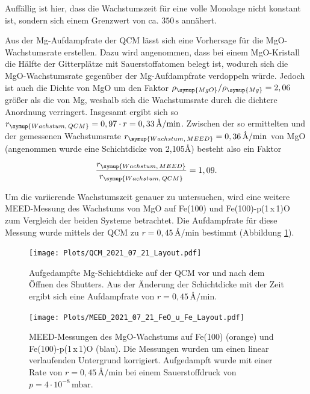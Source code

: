 Auffällig ist hier, dass die Wachstumszeit für eine volle Monolage nicht konstant ist, sondern sich einem Grenzwert von ca. $350\,\si{\second}$ annähert.

Aus der Mg-Aufdampfrate der QCM lässt sich eine Vorhersage für die MgO-Wachstumsrate erstellen. Dazu wird angenommen, dass 
bei einem MgO-Kristall die Hälfte der Gitterplätze mit Sauerstoffatomen belegt ist, wodurch sich die MgO-Wachstumsrate gegenüber der Mg-Aufdampfrate
verdoppeln würde. Jedoch ist auch die Dichte von MgO um den Faktor $\rho_{\symup{MgO}}/\rho_{\symup{Mg}}=2,06$ größer als die von Mg, weshalb
sich die Wachstumsrate durch die dichtere Anordnung verringert. Insgesamt ergibt sich so $r_{\symup{Wachstum,\, QCM}}=0,97\cdot r=0,33\,\si{\angstrom\per\minute}$.
Zwischen der so ermittelten und der gemessenen Wachstumsrate $r_{\symup{Wachstum,\, MEED}}=0,36\,\si{\angstrom\per\minute}$ von MgO (angenommen wurde eine Schichtdicke von 2,105$\si{\angstrom}$) 
besteht also ein Faktor 

\begin{equation*}
  \frac{r_{\symup{Wachstum,\, MEED}}}{r_{\symup{Wachstum,\, QCM}}}=1,09.
\end{equation*}

Um die variierende Wachstumszeit genauer zu untersuchen, wird eine 
weitere MEED-Messung des Wachstums von MgO auf Fe(100) und Fe(100)-p(1\,x\,1)O 
zum Vergleich der beiden Systeme betrachtet.
Die Aufdampfrate für diese Messung wurde 
mittels der QCM zu $r=0,45\,\si{\angstrom\per\minute}$ bestimmt (Abbildung \ref{fig:QCM2}).

\begin{figure}
  \centering
  \texttt{[image: Plots/QCM\_2021\_07\_21\_Layout.pdf]}
  \caption{Aufgedampfte Mg-Schichtdicke auf der QCM vor und nach dem Öffnen des Shutters.
  Aus der Änderung der Schichtdicke mit der Zeit ergibt sich eine Aufdampfrate von $r=0,45\,\si{\angstrom\per\minute}$.}
  \label{fig:QCM2}
\end{figure}



\begin{figure}[H]
  \centering
  \texttt{[image: Plots/MEED\_2021\_07\_21\_FeO\_u\_Fe\_Layout.pdf]}
  \caption{MEED-Messungen des MgO-Wachstums auf Fe(100) (orange) und Fe(100)-p(1\,x\,1)O (blau). Die Messungen wurden um einen linear verlaufenden Untergrund korrigiert.
          Aufgedampft wurde mit einer Rate von $r=0,45\,\si{\angstrom\per\minute}$ 
          bei einem Sauerstoffdruck von $p=4\cdot 10^{-8}\,\si{\milli\bar}$.}
  \label{fig:MEED2}
\end{figure}

